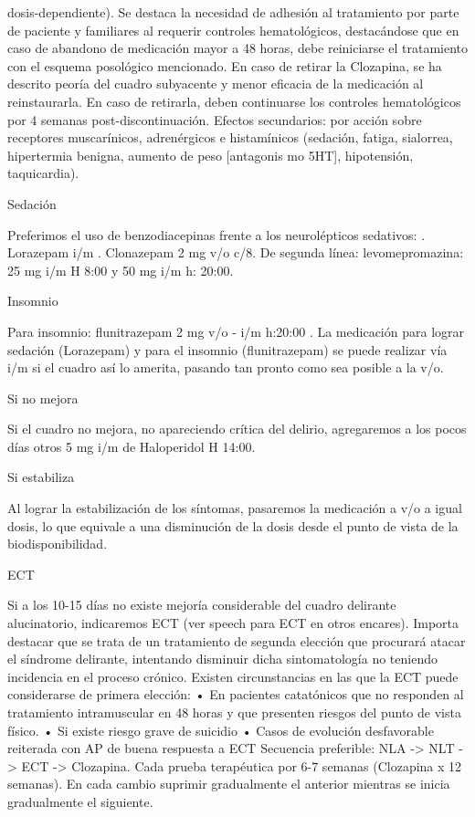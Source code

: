 dosis-dependiente). Se destaca la necesidad de adhesión al tratamiento por parte de paciente y familiares al requerir controles hematológicos, destacándose que en caso de abandono de medicación mayor a 48 horas, debe reiniciarse el tratamiento con el esquema posológico mencionado. En caso de retirar la Clozapina, se ha descrito peoría del cuadro subyacente y menor eficacia de la medicación al reinstaurarla. En caso de retirarla, deben continuarse los controles hematológicos por 4 semanas post-discontinuación. Efectos secundarios: por acción sobre receptores muscarínicos, adrenérgicos e histamínicos (sedación, fatiga, sialorrea, hipertermia benigna, aumento de peso [antagonis mo 5HT], hipotensión, taquicardia).

Sedación

Preferimos el uso de benzodiacepinas frente a los neurolépticos sedativos: . Lorazepam i/m . Clonazepam 2 mg v/o c/8. De segunda línea: levomepromazina: 25 mg i/m H 8:00 y 50 mg i/m h: 20:00.

Insomnio

Para insomnio: flunitrazepam 2 mg v/o - i/m h:20:00 . La medicación para lograr sedación (Lorazepam) y para el insomnio (flunitrazepam) se puede realizar vía i/m si el cuadro así lo amerita, pasando tan pronto como sea posible a la v/o.

Si no mejora

Si el cuadro no mejora, no apareciendo crítica del delirio, agregaremos a los pocos días otros 5 mg i/m de Haloperidol H 14:00.

Si estabiliza

Al lograr la estabilización de los síntomas, pasaremos la medicación a v/o a igual dosis, lo que equivale a una disminución de la dosis desde el punto de vista de la biodisponibilidad.

ECT

Si a los 10-15 días no existe mejoría considerable del cuadro delirante alucinatorio, indicaremos ECT (ver speech para ECT en otros encares). Importa destacar que se trata de un tratamiento de segunda elección que procurará atacar el síndrome delirante, intentando disminuir dicha sintomatología no teniendo incidencia en el proceso crónico. Existen circunstancias en las que la ECT puede considerarse de primera elección: • En pacientes catatónicos que no responden al tratamiento intramuscular en 48 horas y que presenten riesgos del punto de vista físico. • Si existe riesgo grave de suicidio • Casos de evolución desfavorable reiterada con AP de buena respuesta a ECT Secuencia preferible: NLA -> NLT -> ECT -> Clozapina. Cada prueba terapéutica por 6-7 semanas (Clozapina x 12 semanas). En cada cambio suprimir gradualmente el anterior mientras se inicia gradualmente el siguiente.

